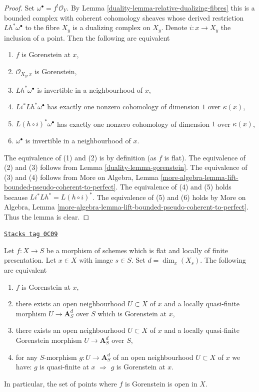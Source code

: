 \begin{proof}

Set $\omega^\bullet = f^!\mathcal{O}_Y$. By
Lemma \ref{duality-lemma-relative-dualizing-fibres}
this is a bounded complex with coherent cohomology
sheaves whose derived restriction $Lh^*\omega^\bullet$
to the fibre $X_y$ is a dualizing complex on $X_y$.
Denote $i : x \to X_y$ the inclusion of a point.
Then the following are equivalent
\begin{enumerate}
\item $f$ is Gorenstein at $x$,
\item $\mathcal{O}_{X_y, x}$ is Gorenstein,
\item $Lh^*\omega^\bullet$ is invertible in a neighbourhood of $x$,
\item $Li^* Lh^* \omega^\bullet$ has exactly one nonzero
cohomology of dimension $1$ over $\kappa(x)$,
\item $L(h \circ i)^* \omega^\bullet$ has exactly one nonzero
cohomology of dimension $1$ over $\kappa(x)$,
\item $\omega^\bullet$ is invertible in a neighbourhood of $x$.
\end{enumerate}
The equivalence of (1) and (2) is by definition (as $f$ is flat).
The equivalence of (2) and (3) follows from
Lemma \ref{duality-lemma-gorenstein}.
The equivalence of (3) and (4) follows from
More on Algebra, Lemma
\ref{more-algebra-lemma-lift-bounded-pseudo-coherent-to-perfect}.
The equivalence of (4) and (5) holds because
$Li^* Lh^* = L(h \circ i)^*$.
The equivalence of (5) and (6) holds by
More on Algebra, Lemma
\ref{more-algebra-lemma-lift-bounded-pseudo-coherent-to-perfect}.
Thus the lemma is clear.
\end{proof}

\begin{lemma}
\label{duality-lemma-flat-finite-presentation-characterize-gorenstein}
\href{https://stacks.math.columbia.edu/tag/0C09}{\texttt{Stacks tag 0C09}}

Let $f : X \to S$ be a morphism of schemes which is flat and locally
of finite presentation. Let $x \in X$ with image $s \in S$.
Set $d = \dim_x(X_s)$. The following are equivalent
\begin{enumerate}
\item $f$ is Gorenstein at $x$,
\item there exists an open neighbourhood $U \subset X$ of $x$
and a locally quasi-finite morphism $U \to \mathbf{A}^d_S$ over $S$
which is Gorenstein at $x$,
\item there exists an open neighbourhood $U \subset X$ of $x$
and a locally quasi-finite Gorenstein morphism $U \to \mathbf{A}^d_S$ over $S$,
\item for any $S$-morphism $g : U \to \mathbf{A}^d_S$
of an open neighbourhood $U \subset X$ of $x$ we have:
$g$ is quasi-finite at $x$ $\Rightarrow$ $g$ is Gorenstein at $x$.
\end{enumerate}
In particular, the set of points where $f$ is Gorenstein is open in $X$.
\end{lemma}

